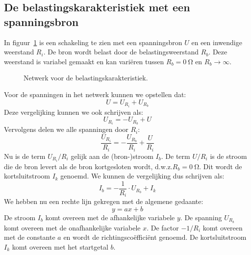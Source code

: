 \subsection{De belastingskarakteristiek met een spanningsbron}
In figuur~\ref{fig:gelschemavoorbelastingskarakteristiek} is een schakeling te zien met een spanningsbron
$U$ en een inwendige weerstand $R_i$. De bron wordt belast door de belastingsweerstand $R_b$. Deze weerstand
is variabel gemaakt en kan vari\"eren tussen $R_b = \SI{0}{\ohm}$ en $R_b \rightarrow \infty$.

\begin{figure}[!ht]
\centering
{}
\captionsetup{width=.9\linewidth}
\caption{Netwerk voor de belastingskarakteristiek.}
\label{fig:gelschemavoorbelastingskarakteristiek}
\end{figure}

Voor de spanningen in het netwerk kunnen we opstellen dat:
%
\begin{equation}
U = U_{R_i} + U_{R_b}
\end{equation}
%
Deze vergelijking kunnen we ook schrijven als:
\begin{equation}
U_{R_i} = - U_{R_b} + U
\end{equation}
%
Vervolgens delen we alle spanningen door $R_i$:
%
\begin{equation}
\dfrac{U_{R_i}}{R_i} = - \dfrac{U_{R_b}}{R_i} + \dfrac{U}{R_i}
\end{equation}
%
Nu is de term $U_{R_i}/R_i$ gelijk aan de (bron-)stroom $I_b$. De term $U/R_i$ is de stroom die de bron levert
als de bron kortgesloten wordt, d.w.z.\@ $R_b=\SI{0}{\ohm}$. Dit wordt de kortsluitstroom $I_k$ genoemd. We kunnen de
vergelijking dus schrijven als:
%
\begin{equation}
\label{equ:gelbelastingsfunctie}
I_b = -\dfrac{1}{R_i}\cdot U_{R_b} + I_k
\end{equation}
%
We hebben nu een rechte lijn gekregen met de algemene gedaante:
%
\begin{equation}
y=ax+b
\end{equation}
%
De stroom $I_b$ komt overeen met de afhankelijke variabele $y$. De spanning $U_{R_b}$ komt overeen met de
onafhankelijke variabele $x$. De factor $-1/R_i$ komt overeen met de constante $a$ en wordt de
richtingsco\"effici\"ent genoemd. De kortsluitstroom $I_k$ komt overeen met het startgetal $b$.

